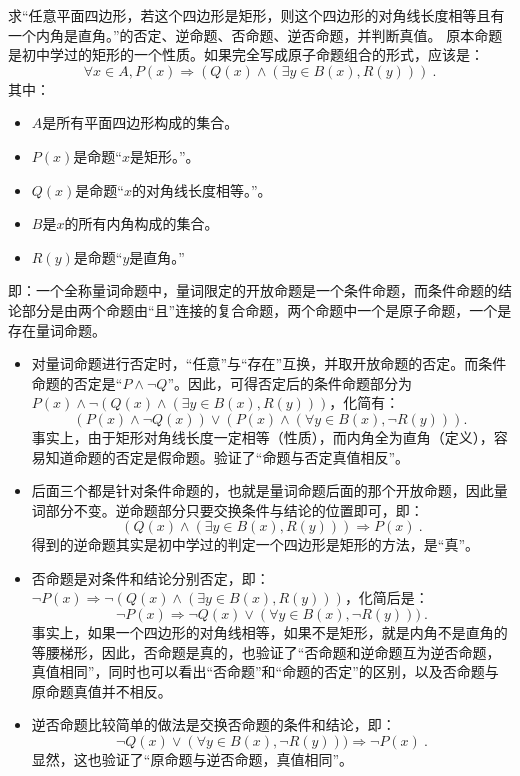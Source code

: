 \begin{exercise}{求“任意平面四边形，若这个四边形是矩形，则这个四边形的对角线长度相等且有一个内角是直角。”的否定、逆命题、否命题、逆否命题，并判断真值。}
原本命题是初中学过的矩形的一个性质。如果完全写成原子命题组合的形式，应该是：
$$\forall x\in A,P(x)\Rightarrow (Q(x)\land (\exists y\in B(x),R(y)))~.$$
其中：
\begin{itemize}
\item $A$是所有平面四边形构成的集合。
\item $P(x)$是命题“$x$是矩形。”。
\item $Q(x)$是命题“$x$的对角线长度相等。”。
\item $B$是$x$的所有内角构成的集合。
\item $R(y)$是命题“$y$是直角。”
\end{itemize}
即：一个全称量词命题中，量词限定的开放命题是一个条件命题，而条件命题的结论部分是由两个命题由“且”连接的复合命题，两个命题中一个是原子命题，一个是存在量词命题。
\begin{itemize}
\item 对量词命题进行否定时，“任意”与“存在”互换，并取开放命题的否定。而条件命题的否定是“$P\land\lnot Q$”。因此，可得否定后的条件命题部分为$P(x)\land\lnot(Q(x)\land (\exists y\in B(x),R(y)))$，化简有：
$$(P(x)\land\lnot Q(x))\lor(P(x)\land(\forall y\in B(x),\lnot R(y))).~$$
事实上，由于矩形对角线长度一定相等（性质），而内角全为直角（定义），容易知道命题的否定是假命题。验证了“命题与否定真值相反”。
\item 后面三个都是针对条件命题的，也就是量词命题后面的那个开放命题，因此量词部分不变。逆命题部分只要交换条件与结论的位置即可，即：
$$(Q(x)\land (\exists y\in B(x),R(y)))\Rightarrow P(x)~.$$
得到的逆命题其实是初中学过的判定一个四边形是矩形的方法，是“真”。
\item 否命题是对条件和结论分别否定，即：$\lnot P(x)\Rightarrow\lnot(Q(x)\land (\exists y\in B(x),R(y)))$，化简后是：
$$\lnot P(x)\Rightarrow\lnot Q(x)\lor (\forall y\in B(x),\lnot R(y)))~.$$
事实上，如果一个四边形的对角线相等，如果不是矩形，就是内角不是直角的等腰梯形，因此，否命题是真的，也验证了“否命题和逆命题互为逆否命题，真值相同”，同时也可以看出“否命题”和“命题的否定”的区别，以及否命题与原命题真值并不相反。
\item 逆否命题比较简单的做法是交换否命题的条件和结论，即：
$$\lnot Q(x)\lor (\forall y\in B(x),\lnot R(y)))\Rightarrow\lnot P(x)~.$$
显然，这也验证了“原命题与逆否命题，真值相同”。
\end{itemize}
\end{exercise}
